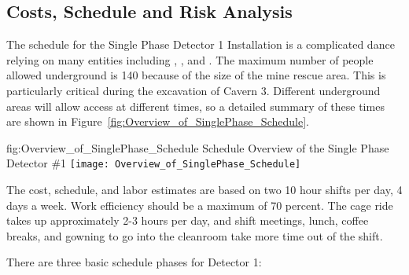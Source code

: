 \subsection{Costs, Schedule and Risk Analysis}
\label{sec:fdsp-tc-inst-cost}



The schedule for the Single Phase Detector 1 Installation is a complicated dance relying on many entities including , , and .  The maximum number of people allowed underground is 140 because of the size of the mine rescue area.  This is particularly critical during the excavation of Cavern 3. Different underground areas will allow access at different times, so a detailed summary of these times are shown in Figure~\ref{fig:Overview_of_SinglePhase_Schedule}. 



\begin{dunefigure}
{fig:Overview_of_SinglePhase_Schedule}
{Schedule Overview of the Single Phase Detector \#1}                
\texttt{[image: Overview\_of\_SinglePhase\_Schedule]}
\end{dunefigure}

The cost, schedule, and labor estimates are based on two 10 hour shifts per day, 4 days a week. Work efficiency should be a maximum of 70 percent.  The cage ride takes up approximately 2-3 hours per day, and shift meetings, lunch, coffee breaks, and gowning to go into the cleanroom take more time out of the shift. 

There are three basic schedule phases for Detector 1:

